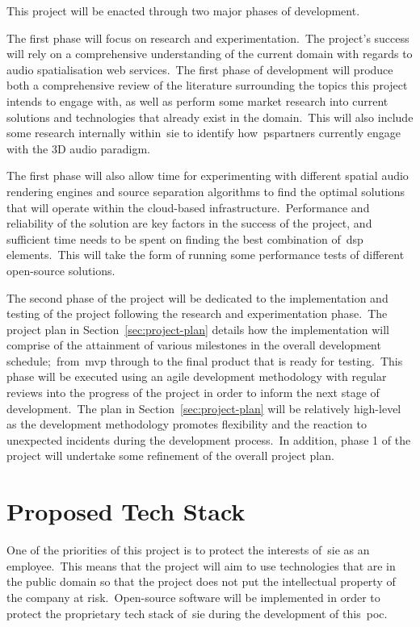 \documentclass[a4paper, 12pt, british]{article}
\begin{document}
This project will be enacted through two major phases of development.

The first phase will focus on research and experimentation.\ The project's success will rely on a comprehensive understanding of the current domain with regards to audio spatialisation web services.\ The first phase of development will produce both a comprehensive review of the literature surrounding the topics this project intends to engage with, as well as perform some market research into current solutions and technologies that already exist in the domain.\ This will also include some research internally within~\gls{sie} to identify how~\glspl{pspartner} currently engage with the 3D audio paradigm.

The first phase will also allow time for experimenting with different spatial audio rendering engines and source separation algorithms to find the optimal solutions that will operate within the cloud-based infrastructure.\ Performance and reliability of the solution are key factors in the success of the project, and sufficient time needs to be spent on finding the best combination of~\gls{dsp} elements.\ This will take the form of running some performance tests of different open-source solutions.

The second phase of the project will be dedicated to the implementation and testing of the project following the research and experimentation phase.\ The project plan in Section~\ref{sec:project-plan} details how the implementation will comprise of the attainment of various milestones in the overall development schedule;\ from~\gls{mvp} through to the final product that is ready for testing.\ This phase will be executed using an agile development methodology with regular reviews into the progress of the project in order to inform the next stage of development.\ The plan in Section~\ref{sec:project-plan} will be relatively high-level as the development methodology promotes flexibility and the reaction to unexpected incidents during the development process.\ In addition, phase 1 of the project will undertake some refinement of the overall project plan.

\section{Proposed Tech Stack}\label{sec:proposed-tech-stack}
One of the priorities of this project is to protect the interests of~\gls{sie} as an employee.\ This means that the project will aim to use technologies that are in the public domain so that the project does not put the intellectual property of the company at risk.\ Open-source software will be implemented in order to protect the proprietary tech stack of~\gls{sie} during the development of this~\gls{poc}.
\end{document}
